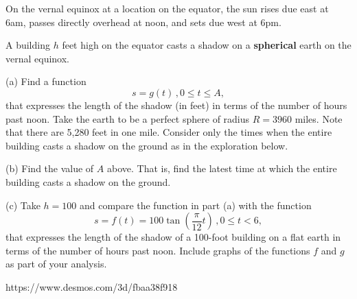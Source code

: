 \documentclass{ximera}
\begin{document}
\begin{question}  \label{Q4:SineCosine}
On the vernal equinox at a location on the equator, the sun rises due east at 6am, passes directly overhead at noon, and sets due west at 6pm. 

A building $h$ feet high on the equator casts a shadow on a {\bf spherical} earth on the vernal equinox. 

(a) Find a function
\[
   s = g(t) \, , 0\leq t \leq A ,
\]
that expresses the length of the shadow (in feet) in terms of the number of hours past noon. Take the earth to be a perfect sphere of radius $R=3960$ miles. Note that there are 5,280 feet in one mile. Consider only the times when the entire building casts a shadow on the ground as in the exploration below.

(b) Find the value of $A$ above. That is, find the latest time at which the entire building casts a shadow on the ground.

(c) Take $h=100$ and compare the function in part (a) with the function 
\[
  s = f(t) = 100 \tan \left( \frac{\pi}{12}t \right) \, , 0\leq t < 6 ,
\]
that expresses the length of the shadow of a 100-foot building on a flat earth in terms of the number of hours past noon. Include graphs of the functions $f$ and $g$ as part of your analysis.

\begin{exploration}

 
\begin{onlineOnly}
    \begin{center}
\end{center}
\end{onlineOnly}
\end{exploration} 

\end{question}




https://www.desmos.com/3d/fbaa38f918



 
\begin{onlineOnly}
    \begin{center}
\end{center}
\end{onlineOnly}
\end{document}
